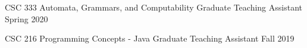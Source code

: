 \begin{cvhonors}

  \cvhonor
    {CSC 333 Automata, Grammars, and Computability} %
    {Graduate Teaching Assistant} %
    {} %
    {\footnotesize Spring 2020} %

  \cvhonor
    {CSC 216 Programming Concepts - Java} %
    {Graduate Teaching Assistant} %
    {} %
    {\footnotesize Fall 2019} %

\end{cvhonors}

